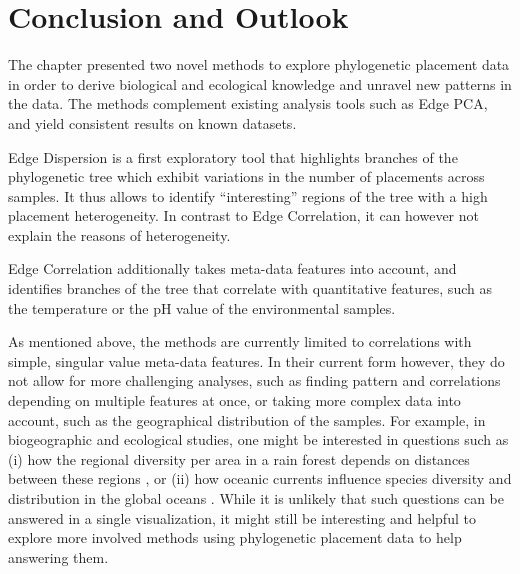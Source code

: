 
\section{Conclusion and Outlook}
\label{ch:Visualization:sec:ConclusionOutlook}


The chapter presented two novel methods to explore phylogenetic placement data
in order to derive biological and ecological knowledge and unravel new patterns in the data.
The methods complement existing analysis tools such as Edge PCA,
and yield consistent results on known datasets.

Edge Dispersion is a first exploratory tool that highlights branches of the phylogenetic tree
which exhibit variations in the number of placements across samples.
It thus allows to identify ``interesting'' regions of the tree with a high placement heterogeneity.
In contrast to Edge Correlation, it can however not explain the reasons of heterogeneity.

Edge Correlation additionally takes meta-data features into account,
and identifies branches of the tree that correlate with quantitative features,
such as the temperature or the pH value of the environmental samples.


As mentioned above, the methods are currently limited to correlations with simple, singular value meta-data features.
In their current form however, they do not allow for more challenging analyses,
such as finding pattern and correlations depending on multiple features at once,
or taking more complex data into account, such as the geographical distribution of the samples.
For example, in biogeographic and ecological studies, one might be interested in questions such as
(i) how the regional diversity per area in a rain forest depends on distances between these regions \cite{Lentendu2018},
or (ii) how oceanic currents influence species diversity and distribution in the global oceans \cite{Sunagawa2015}.
While it is unlikely that such questions can be answered in a single visualization,
it might still be interesting and helpful to explore more involved methods
using phylogenetic placement data to help answering them.

